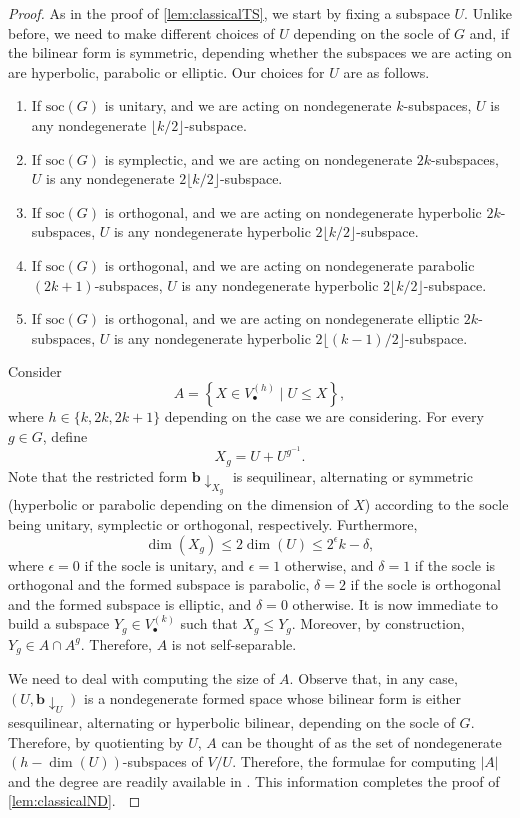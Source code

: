 \documentclass[a4paper]{amsart}
\theoremstyle{definition}
\begin{document}
\begin{proof}
    As in the proof of \cref{lem:classicalTS}, we start by fixing a subspace $U$. Unlike before, we need to make different choices of $U$ depending on the socle of $G$ and, if the bilinear form is symmetric, depending whether the subspaces we are acting on are hyperbolic, parabolic or elliptic. Our choices for $U$ are as follows.
    \begin{enumerate}[$(i)$]
        \item If $\mathrm{soc}(G)$ is unitary, and we are acting on nondegenerate $k$-subspaces, $U$ is any nondegenerate $\lfloor k/2 \rfloor$-subspace.
        \item If $\mathrm{soc}(G)$ is symplectic, and we are acting on nondegenerate $2k$-subspaces, $U$ is any nondegenerate $2\lfloor k/2 \rfloor$-subspace.
        \item If $\mathrm{soc}(G)$ is orthogonal, and we are acting on nondegenerate hyperbolic $2k$-subspaces, $U$ is any nondegenerate hyperbolic $2\lfloor k/2 \rfloor$-subspace.
        \item If $\mathrm{soc}(G)$ is orthogonal, and we are acting on nondegenerate parabolic $(2k+1)$-subspaces, $U$ is any nondegenerate hyperbolic $2\lfloor k/2 \rfloor$-subspace.
        \item If $\mathrm{soc}(G)$ is orthogonal, and we are acting on nondegenerate elliptic $2k$-subspaces, $U$ is any nondegenerate hyperbolic $2\lfloor (k-1)/2 \rfloor$-subspace.
    \end{enumerate}
    Consider
    \[ A = \left\{ X \in V^{(h)}_{\bullet} \mid U \le X\right\} ,\]
    where $h \in \{k, 2k, 2k+1\}$ depending on the case we are considering. For every $g\in G$, define
    \[X_g = U + U^{g^{-1}}.\]
    Note that the restricted form $\mathbf{b} \downarrow _{X_g}$ is sequilinear, alternating or symmetric (hyperbolic or parabolic depending on the dimension of $X$) according to the socle being unitary, symplectic or orthogonal, respectively. Furthermore,
    \[ \dim(X_g) \le 2\dim(U) \le 2^\epsilon k - \delta ,\]
    where $\epsilon = 0$ if the socle is unitary, and $\epsilon=1$ otherwise, and $\delta=1$ if the socle is orthogonal and the formed subspace is parabolic, $\delta=2$ if the socle is orthogonal and the formed subspace is elliptic, and $\delta=0$ otherwise. It is now immediate to build a subspace $Y_g \in V^{(k)}_\bullet$ such that $X_g \le Y_g$. Moreover, by construction, $Y_g \in A \cap A^g$. Therefore, $A$ is not self-separable.

    We need to deal with computing the size of $A$. Observe that, in any case, $(U, \mathbf{b}\downarrow_U)$ is a nondegenerate formed space whose bilinear form is either sesquilinear, alternating or hyperbolic bilinear, depending on the socle of $G$. Therefore, by quotienting by $U$, $A$ can be thought of as the set of nondegenerate $(h-\dim(U))$-subspaces of $V/U$. Therefore, the formulae for computing $|A|$ and the degree are readily available in \cite[Table~4.1.2]{BurnessGiudici2016}. This information completes the proof of \cref{lem:classicalND}. \hfill $\qedhere$


\end{proof}
\end{document}
